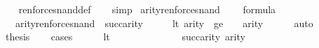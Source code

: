 \begin{isabellebody}
%
\isadelimproof
\ \ %
\endisadelimproof
%
\isatagproof
{}\isamarkupfalse%
\ ren{\isacharunderscore}{\kern0pt}forces{\isacharunderscore}{\kern0pt}nand{\isacharunderscore}{\kern0pt}def\isanewline
\ \ \isamarkupfalse%
\ simp%
\endisatagproof
{\isafoldproof}%
%
\isadelimproof
\isanewline
%
\endisadelimproof
\isanewline
{}\isamarkupfalse%
\ arity{\isacharunderscore}{\kern0pt}ren{\isacharunderscore}{\kern0pt}forces{\isacharunderscore}{\kern0pt}nand\ {\isacharcolon}{\kern0pt}\isanewline
\ \ \ {\isachardoublequoteopen}{\isasymphi}{\isasymin}formula{\isachardoublequoteclose}\isanewline
\ \ \ {\isachardoublequoteopen}arity{\isacharparenleft}{\kern0pt}ren{\isacharunderscore}{\kern0pt}forces{\isacharunderscore}{\kern0pt}nand{\isacharparenleft}{\kern0pt}{\isasymphi}{\isacharparenright}{\kern0pt}{\isacharparenright}{\kern0pt}\ {\isasymle}\ succ{\isacharparenleft}{\kern0pt}arity{\isacharparenleft}{\kern0pt}{\isasymphi}{\isacharparenright}{\kern0pt}{\isacharparenright}{\kern0pt}{\isachardoublequoteclose}\isanewline
%
\isadelimproof
%
\endisadelimproof
%
\isatagproof
{}\isamarkupfalse%
\ {\isacharminus}{\kern0pt}\isanewline
\ \ \isamarkupfalse%
\ {\isacharparenleft}{\kern0pt}lt{\isacharparenright}{\kern0pt}\ {\isachardoublequoteopen}{}{\isacharless}{\kern0pt}arity{\isacharparenleft}{\kern0pt}{\isasymphi}{\isacharparenright}{\kern0pt}{\isachardoublequoteclose}\ {\isacharbar}{\kern0pt}\ {\isacharparenleft}{\kern0pt}ge{\isacharparenright}{\kern0pt}\ {\isachardoublequoteopen}{\isasymnot}\ {}\ {\isacharless}{\kern0pt}\ arity{\isacharparenleft}{\kern0pt}{\isasymphi}{\isacharparenright}{\kern0pt}{\isachardoublequoteclose}\isanewline
\ \ \ \ \isamarkupfalse%
\ auto\isanewline
\ \ \isamarkupfalse%
\isanewline
\ \ \isamarkupfalse%
\ {\isacharquery}{\kern0pt}thesis\isanewline
\ \ \isamarkupfalse%
\ cases\isanewline
\ \ \ \ \isamarkupfalse%
\ lt\isanewline
\ \ \ \ \isamarkupfalse%
\ {\isacartoucheopen}{\isasymphi}{\isasymin}{\isacharunderscore}{\kern0pt}{\isacartoucheclose}\isanewline
\ \ \ \ \isamarkupfalse%
\ {\isachardoublequoteopen}{}\ {\isacharless}{\kern0pt}\ succ{\isacharparenleft}{\kern0pt}arity{\isacharparenleft}{\kern0pt}{\isasymphi}{\isacharparenright}{\kern0pt}{\isacharparenright}{\kern0pt}{\isachardoublequoteclose}\ {\isachardoublequoteopen}{}{\isacharless}{\kern0pt}arity{\isacharparenleft}{\kern0pt}{\isasymphi}{\isacharparenright}{\kern0pt}{\isacharhash}{\kern0pt}{\isacharplus}{\kern0pt}{}{\isachardoublequoteclose}\isanewline

\end{isabellebody}
